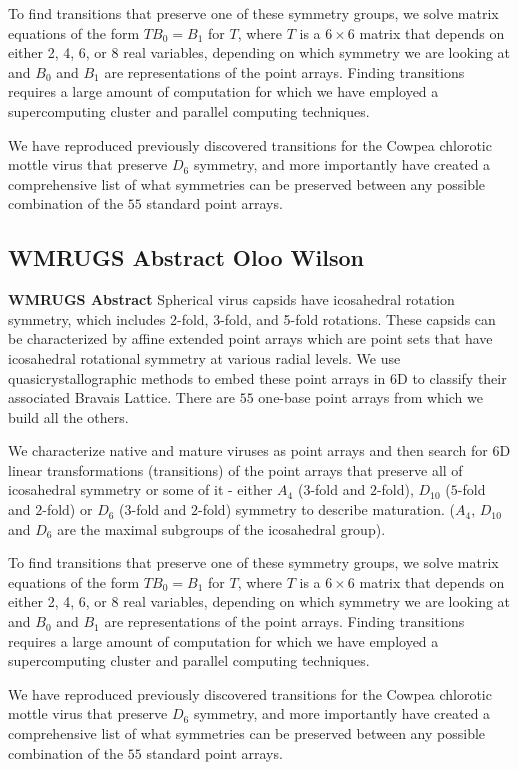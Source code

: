 \documentclass[a4paper,10pt]{article}
\theoremstyle{plain}
\theoremstyle{definition}
\theoremstyle{remark}
\begin{document}
To find transitions that preserve one of these symmetry groups, we solve matrix equations of the form \(TB_0 = B_1\) for \(T\), where \(T\) is a \(6\times6\) matrix that depends on either 2, 4, 6, or 8 real variables, depending on which symmetry we are looking at and \(B_0\) and \(B_1\) are representations of the point arrays.
Finding transitions requires a large amount of computation for which we have employed a supercomputing cluster and parallel computing techniques.

We have reproduced previously discovered transitions for the Cowpea chlorotic mottle virus that preserve \(D_6\) symmetry, and more importantly have created a comprehensive list of what symmetries can be preserved between any possible combination of the \(55\) standard point arrays.

\subsection{WMRUGS Abstract Oloo Wilson}
\textbf{WMRUGS Abstract}
Spherical virus capsids have icosahedral rotation symmetry, which includes 2-fold, 3-fold, and 5-fold rotations. These capsids can be characterized  by affine extended point arrays which are point sets that have icosahedral rotational symmetry at various radial levels. We use quasicrystallographic methods to embed these point arrays in 6D to classify their associated Bravais Lattice. There are \(55\) one-base point arrays from which we build all the others.

We characterize native and mature viruses as point arrays and then search for 6D linear transformations (transitions) of the point arrays that preserve all of  icosahedral symmetry or some of it - either  $A_4$ ($3$-fold and $2$-fold), $D_{10}$ ($5$-fold and $2$-fold) or $D_6$ ($3$-fold and $2$-fold) symmetry to describe maturation. ($A_4$, $D_{10}$ and $D_6$ are the maximal subgroups of the icosahedral group).

To find transitions that preserve one of these symmetry groups, we solve matrix equations of the form \(TB_0 = B_1\) for \(T\), where \(T\) is a \(6\times6\) matrix that depends on either 2, 4, 6, or 8 real variables, depending on which symmetry we are looking at and \(B_0\) and \(B_1\) are representations of the point arrays.
Finding transitions requires a large amount of computation for which we have employed a supercomputing cluster and parallel computing techniques.

We have reproduced previously discovered transitions for the Cowpea chlorotic mottle virus that preserve \(D_6\) symmetry, and more importantly have created a comprehensive list of what symmetries can be preserved between any possible combination of the \(55\) standard point arrays.
\end{document}
